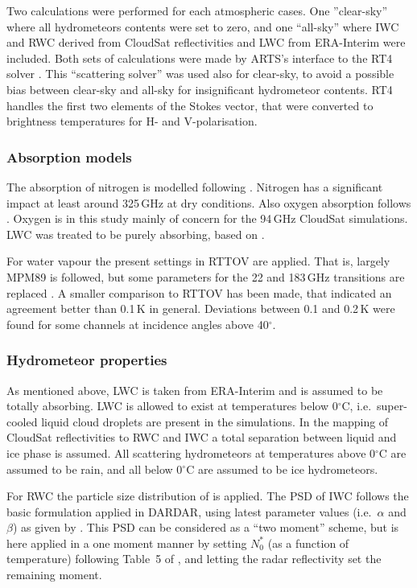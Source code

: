 \documentclass[12pt]{article}
\begin{document}
Two calculations were performed for each atmospheric cases. One ''clear-sky''
where all hydrometeors contents were set to zero, and one ``all-sky'' where IWC
and RWC derived from CloudSat reflectivities and LWC from ERA-Interim were
included. Both sets of calculations were made by ARTS's interface to the
RT4 solver \citep{evans1995microwavec}. This ``scattering solver'' was used
also for clear-sky, to avoid a possible bias between clear-sky and all-sky for
insignificant hydrometeor contents. RT4 handles the first two elements of the
Stokes vector, that were converted to brightness temperatures for H- and
V-polarisation.


\subsubsection{Absorption models}
%
The absorption of nitrogen is modelled following \citet{pwr:93}. Nitrogen has a
significant impact at least around 325\,GHz at dry conditions. Also oxygen
absorption follows \citet{pwr:93}. Oxygen is in this study mainly of concern
for the 94\,GHz CloudSat simulations. LWC was treated to be
purely absorbing, based on \citet{ellison2007permittivity}.

For water vapour the present settings in RTTOV are applied. That is, largely
MPM89 \citep{liebe:89} is followed, but some parameters for the 22 and 183\,GHz
transitions are replaced \citep{saunders2018update,turner2019amsutran}. A
smaller comparison to RTTOV has been made, that indicated an agreement better
than 0.1\,K in general. Deviations between 0.1 and 0.2\,K were found for some
channels at incidence angles above 40$^\circ$.


\subsubsection{Hydrometeor properties}
%
As mentioned above, LWC is taken from ERA-Interim and is assumed to be totally
absorbing. LWC is allowed to exist at temperatures below 0$^\circ$C, i.e.\
super-cooled liquid cloud droplets are present in the simulations. In the
mapping of CloudSat reflectivities to RWC and IWC a total separation between
liquid and ice phase is assumed. All scattering hydrometeors at temperatures
above 0$^\circ$C are assumed to be rain, and all below 0$^\circ$C are assumed
to be ice hydrometeors.

For RWC the particle size distribution of \citet{abel2012improved} is applied.
The PSD of IWC follows the basic formulation applied in DARDAR, using latest
parameter values (i.e.\ $\alpha$ and $\beta$) as given by
\citet{amt-12-2819-2019}. This PSD can be considered as a ``two moment''
scheme, but is here applied in a one moment manner by setting $N_0^*$ (as a
function of temperature) following Table~5 of \citet{delanoe2014normalized},
and letting the radar reflectivity set the remaining moment.
\end{document}
